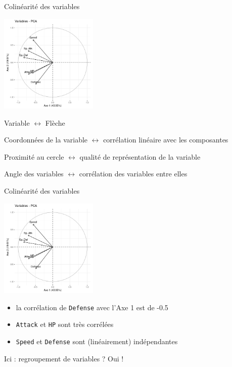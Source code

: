 \documentclass{beamer}
\begin{document}
\begin{frame}{Colinéarité des variables}

\begin{center}
\includegraphics[width=0.35\textwidth,keepaspectratio]{img/cercle_trigo_ACP_var.png}
\end{center}

\begin{spacing}{0.7}
Variable $\leftrightarrow$  Flèche 

Coordonnées de la variable $\leftrightarrow$ \alert{corrélation linéaire}  avec les composantes

Proximité au cercle $\leftrightarrow$ qualité de \alert{représentation} de la variable

Angle des variables $\leftrightarrow$ corrélation des variables entre elles
\end{spacing}



\end{frame}



\begin{frame}{Colinéarité des variables}

\begin{center}
\includegraphics[width=0.35\textwidth,keepaspectratio]{img/cercle_trigo_ACP_var.png}
\end{center}


\begin{itemize}
\item la corrélation de \texttt{Defense} avec l'Axe 1 est de -0.5
\item \texttt{Attack} et \texttt{HP} sont très corrélées
\item \texttt{Speed} et \texttt{Defense} sont (linéairement) indépendantes
\end{itemize}



Ici : regroupement de variables ? Oui ! 


\end{frame}
\end{document}
